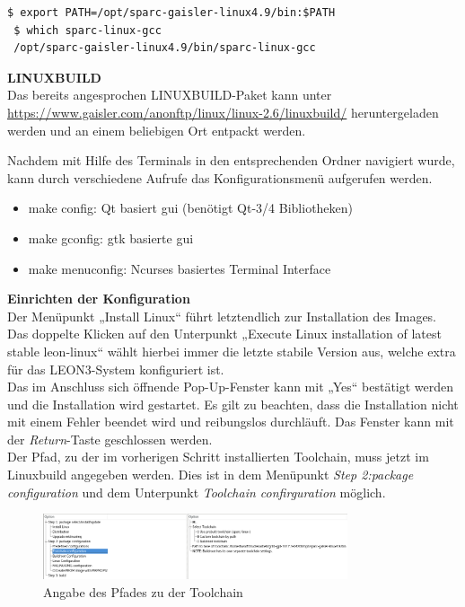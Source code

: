 \begin{lstlisting}[caption={Anpassen der Umgebungsvariablen},label={code:linuxpath}]
$ export PATH=/opt/sparc-gaisler-linux4.9/bin:$PATH
 $ which sparc-linux-gcc
 /opt/sparc-gaisler-linux4.9/bin/sparc-linux-gcc
\end{lstlisting}

\vspace{2mm}
\textbf{LINUXBUILD}\\

Das bereits angesprochen LINUXBUILD-Paket kann unter \url{https://www.gaisler.com/anonftp/linux/linux-2.6/linuxbuild/} heruntergeladen werden und an einem beliebigen Ort entpackt werden.

Nachdem mit Hilfe des Terminals in den entsprechenden Ordner navigiert wurde, kann durch verschiedene Aufrufe das Konfigurationsmenü aufgerufen werden.

\begin{itemize}
\item make config: Qt basiert \acs{gui} (benötigt Qt-3/4 Bibliotheken)
\item make gconfig: \ac{gtk} basierte \ac{gui}
\item make menuconfig: Ncurses basiertes Terminal Interface
\end{itemize}

\textbf{Einrichten der Konfiguration}\\

Der Menüpunkt „Install Linux“ führt letztendlich zur Installation des Images.
 Das doppelte Klicken auf den Unterpunkt „Execute Linux installation of latest stable leon-linux“ wählt hierbei immer die letzte stabile Version aus, welche extra für das LEON3-System konfiguriert ist. \\
Das im Anschluss sich öffnende Pop-Up-Fenster kann mit „Yes“ bestätigt werden und die Installation wird gestartet.
Es gilt zu beachten, dass die Installation nicht mit einem Fehler beendet wird und reibungslos durchläuft. Das Fenster kann mit der \emph{Return}-Taste geschlossen werden.\\

Der Pfad, zu der im vorherigen Schritt installierten Toolchain, muss jetzt im Linuxbuild angegeben werden.
Dies ist in dem Menüpunkt \emph{Step 2:package configuration} und dem Unterpunkt \emph{Toolchain confirguration} möglich.\\

\begin{figure}[H]
\centering
\includegraphics[width=0.8\textwidth]{Hauptteil/toolchainconf.png}
\caption{Angabe des Pfades zu der Toolchain}
\label{fig:toolchainconf}
\end{figure}

